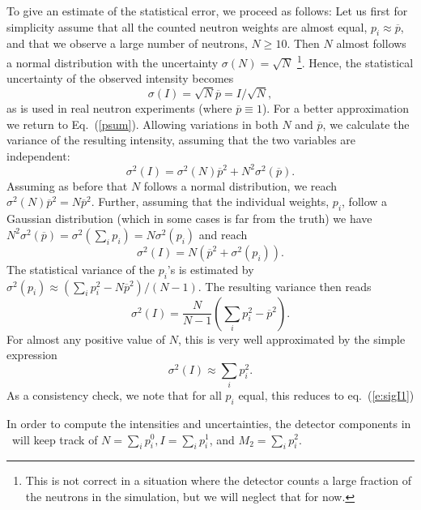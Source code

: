 To give an estimate of the statistical error, we proceed as follows:
Let us first for simplicity assume that all the counted neutron weights are
almost equal, $p_i \approx \overline{p}$,
and that we observe a large number of neutrons, $N \geq 10$.
Then $N$ almost follows a normal distribution
with the uncertainty $\sigma(N) = \sqrt{N}$
\footnote{This is not correct in a
situation where the detector counts a large fraction of the
neutrons in the simulation, but we will neglect that for now.}.
Hence, the statistical uncertainty of the observed intensity becomes
\begin{equation} \label{e:sigI1}
 \sigma(I) = \sqrt{N} \overline{p} = I / \sqrt{N} ,
\end{equation}
as is used in real neutron experiments (where $\overline{p} \equiv 1$).
For a better approximation we return to Eq.~(\ref{psum}).
Allowing variations in both $N$ and $\overline{p}$,
we calculate the variance of the resulting intensity,
assuming that the two variables are independent:
\begin{equation}
\sigma^2(I) = \sigma^2(N) \overline{p}^2 + N^2 \sigma^2(\overline{p}) .
\end{equation}
Assuming as before that $N$ follows a normal distribution, we reach
$\sigma^2(N) \overline{p}^2 = N \overline{p}^2$.
Further, assuming that the individual weights, $p_i$,
follow a Gaussian distribution (which in some cases is far from the truth)
we have
$N^2 \sigma^2(\overline{p}) = \sigma^2(\sum_i p_i) = N \sigma^2(p_i)$
and reach
\begin{equation}
\sigma^2(I) = N \left( \overline{p}^2 + \sigma^2(p_i) \right).
\end{equation}
The statistical variance of the $p_i$'s is estimated by
$\sigma^2(p_i) \approx  (\sum_i p_i^2 - N \overline{p}^2) / (N-1)$.
The resulting variance then reads
\begin{equation}
\sigma^2(I) = \frac{N}{N-1} \left( \sum_i p_i^2 - \overline{p}^2  \right) .
\end{equation}
For almost any positive value of $N$, this is very well approximated
by the simple expression
\begin{equation}
\sigma^2(I) \approx \sum_i p_i^2 .
\end{equation}
As a consistency check, we note that for all $p_i$ equal, this reduces to
eq.~(\ref{e:sigI1})

In order to compute the intensities and uncertainties, the detector components
in \MCS\ will keep track of
$N=\sum_i p_i^0, I=\sum_i p_i^1$, and $M_2 = \sum_i p_i^2$.

